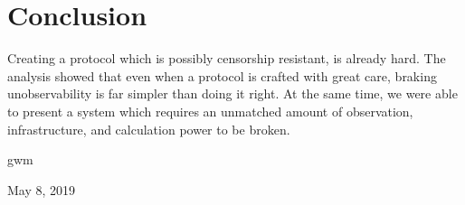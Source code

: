 \documentclass[10pt,journal,compsoc]{IEEEtran}
\let\MYoriglatexcaption\caption
\renewcommand{\caption}[2][\relax]{\MYoriglatexcaption[#2]{#2}}
\begin{document}
\section{Conclusion}
Creating a protocol which is possibly censorship resistant, is already hard. The analysis showed that even when a protocol is crafted with great care, braking unobservability is far simpler than doing it right. At the same time, we were able to present a system which requires an unmatched amount of observation, infrastructure, and calculation power to be broken.

\hfill gwm
 
\hfill May 8, 2019





%
%

\end{document}
